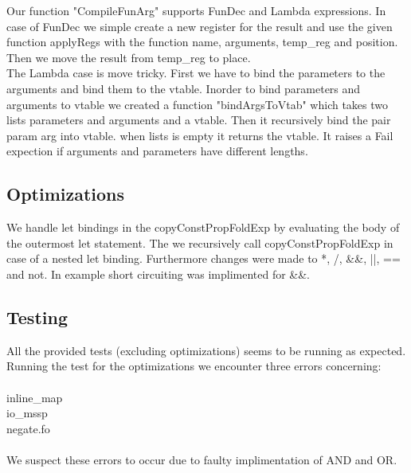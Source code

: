 \documentclass[12pt]{article}
\numberwithin{listing}{section}
\begin{document}
Our function "CompileFunArg" supports FunDec and Lambda expressions. In case of FunDec we simple create a new register for the result and use the given function applyRegs with the function name, arguments, temp\_reg and position. Then we move the result from temp\_reg to place.\\
The Lambda case is move tricky. First we have to bind the parameters to the arguments and bind them to the vtable. Inorder to bind parameters and arguments to vtable we created a function "bindArgsToVtab" which takes two lists parameters and arguments and a vtable. Then it recursively bind the pair param arg into vtable. when lists is empty it returns the vtable. It raises a Fail expection if arguments and parameters have different lengths.

\subsection*{Optimizations}
We handle let bindings in the copyConstPropFoldExp by evaluating the body of the outermost let statement. The we recursively call copyConstPropFoldExp in case of a nested let binding. Furthermore changes were made to *, /, \&\&, ||, == and not. In example short circuiting was implimented for \&\&.

\subsection*{Testing}
All the provided tests (excluding optimizations) seems to be running as expected. Running the test for the optimizations we encounter three errors concerning:
\\\\ inline\_map \\ io\_mssp \\ negate.fo \\\\
We suspect these errors to occur due to faulty implimentation of AND and OR.




%
\end{document}
